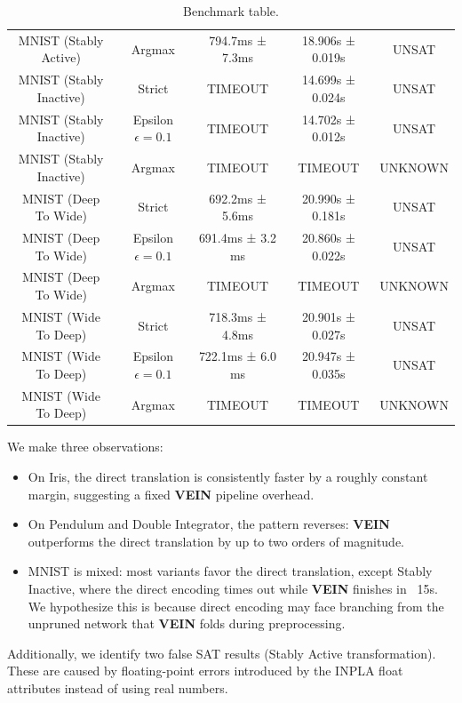 \begin{table}[H]
{\begin{tabular}[t]{ccccc}
			MNIST (Stably Active) & Argmax & 794.7ms ± 7.3ms & 18.906s ± 0.019s & UNSAT \\
			MNIST (Stably Inactive) & Strict & TIMEOUT & 14.699s ± 0.024s & UNSAT \\
			MNIST (Stably Inactive) & Epsilon $\epsilon=0.1$ & TIMEOUT & 14.702s ± 0.012s & UNSAT \\
			MNIST (Stably Inactive) & Argmax & TIMEOUT & TIMEOUT & UNKNOWN \\
			MNIST (Deep To Wide) & Strict & 692.2ms ± 5.6ms & 20.990s ± 0.181s & UNSAT \\
			MNIST (Deep To Wide) & Epsilon $\epsilon=0.1$ & 691.4ms ± 3.2 ms & 20.860s ± 0.022s & UNSAT \\
			MNIST (Deep To Wide) & Argmax & TIMEOUT & TIMEOUT & UNKNOWN \\
			MNIST (Wide To Deep) & Strict & 718.3ms ± 4.8ms & 20.901s ± 0.027s & UNSAT \\
			MNIST (Wide To Deep) & Epsilon $\epsilon=0.1$ & 722.1ms ± 6.0 ms & 20.947s ± 0.035s & UNSAT \\
			MNIST (Wide To Deep) & Argmax & TIMEOUT & TIMEOUT & UNKNOWN \\
		\end{tabular}
	}
	\caption{Benchmark table.}
	\label{tab:benchmarks}
\end{table}

We make three observations:
\begin{itemize}
	\item On Iris, the direct translation is consistently faster by a roughly constant
		margin, suggesting a fixed \textbf{VEIN} pipeline overhead.
	\item On Pendulum and Double Integrator, the pattern reverses: \textbf{VEIN} outperforms the direct
		translation by up to two orders of magnitude.
	\item MNIST is mixed: most variants favor the direct translation, except Stably Inactive,
		where the direct encoding times out while \textbf{VEIN} finishes in ~15s. We hypothesize this is because
		direct encoding may face branching from the unpruned network that \textbf{VEIN} folds during
		preprocessing.
\end{itemize}
Additionally, we identify two false SAT results (Stably Active transformation). These are caused
by floating-point errors introduced by the INPLA float attributes instead of using real numbers.
